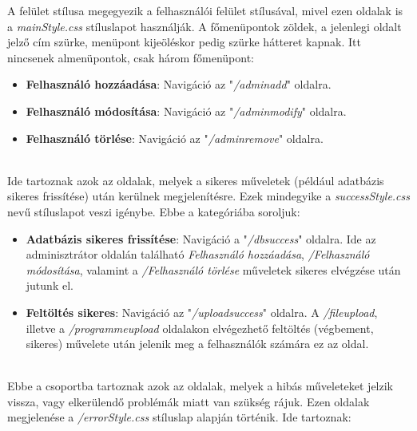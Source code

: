 A felület stílusa megegyezik a felhasználói felület stílusával, mivel ezen oldalak is a \textit{mainStyle.css} stíluslapot használják. A főmenüpontok zöldek, a jelenlegi oldalt jelző cím szürke, menüpont kijeöléskor pedig szürke hátteret kapnak. Itt nincsenek almenüpontok, csak három főmenüpont:

\begin{itemize}
\item{\textbf{Felhasználó hozzáadása}: Navigáció az "\textit{/adminadd}" oldalra.}
\item{\textbf{Felhasználó módosítása}: Navigáció az "\textit{/adminmodify}" oldalra.}
\item{\textbf{Felhasználó törlése}: Navigáció az "\textit{/adminremove}" oldalra.}
\end{itemize}

\\

Ide tartoznak azok az oldalak, melyek a sikeres műveletek (például adatbázis sikeres frissítése) után kerülnek megjelenítésre. Ezek mindegyike a \textit{successStyle.css} nevű stíluslapot veszi igénybe. Ebbe a kategóriába soroljuk:

\begin{itemize}
\item{\textbf{Adatbázis sikeres frissítése}: Navigáció a "\textit{/dbsuccess}" oldalra. Ide az adminisztrátor oldalán található \textit{Felhasználó hozzáadása}, \textit{/Felhasználó módosítása}, valamint a \textit{/Felhasználó törlése} műveletek sikeres elvégzése után jutunk el.}
\item{\textbf{Feltöltés sikeres}: Navigáció az "\textit{/uploadsuccess}" oldalra. A \textit{/fileupload}, illetve a \textit{/programmeupload} oldalakon elvégezhető feltöltés (végbement, sikeres) művelete után jelenik meg a felhasználók számára ez az oldal.}
\end{itemize}

\\

Ebbe a csoportba tartoznak azok az oldalak, melyek a hibás műveleteket jelzik vissza, vagy elkerülendő problémák miatt van szükség rájuk. Ezen oldalak megjelenése a \textit{/errorStyle.css} stíluslap alapján történik. Ide tartoznak:

